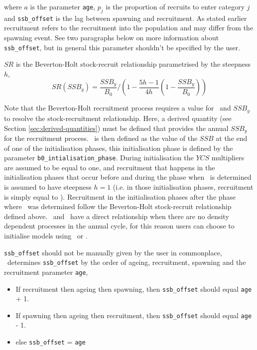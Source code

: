 where $a$ is the parameter \texttt{age}, $p_j$ is the proportion of recruits to enter category $j$ and \texttt{ssb\_offset} is the lag between spawning and recruitment. As stated earlier recruitment refers to the recruitment into the population and may differ from the spawning event. See two paragraphs below on more information about \texttt{ssb\_offset}, but in general this parameter shouldn't be specified by the user.

$SR$ is the Beverton-Holt stock-recruit relationship parametrised by the steepness $h$,
\begin{equation}\label{eq:BH_SR}
SR(SSB_y) = \frac{SSB_y}{B_0} / \left( 1-\frac{5h-1}{4h} \left( 1-\frac{SSB_y}{B_0} \right) \right)
\end{equation}

Note that the Beverton-Holt recruitment process requires a value for \Bzero\ and $SSB_y$ to resolve the stock-recruitment relationship. Here, a derived quantity (see Section \ref{sec:derived-quantities}) must be defined that provides the annual $SSB_y$ for the recruitment process. \Bzero\ is then defined as the value of the $SSB$ at the end of one of the initialisation phases, this initialisation phase is defined by the parameter \texttt{b0\_intialisation\_phase}. During initialisation the $YCS$ multipliers are assumed to be equal to one, and recruitment that happens in the initialisation phases that occur before and during the phase when \Bzero\ is determined is assumed to have steepness $h=1$ (i.e. in those initialisation phases, recruitment is simply equal to \Rzero). Recruitment in the initialisation phases after the phase where \Bzero\ was determined follow the Beverton-Holt stock-recruit relationship defined above. \Rzero\ and \Bzero\ have a direct relationship when there are no density dependent processes in the annual cycle, for this reason users can choose to initialise models using \Bzero\ or \Rzero.

\texttt{ssb\_offset} should not be manually given by the user in commonplace, \CNAME\ determines \texttt{ssb\_offset} by the order of ageing, recruitment, spawning and the recruitment parameter \texttt{age}, 
\begin{itemize}
	\item If recruitment then ageing then spawning, then \texttt{ssb\_offset} should equal \texttt{age} + 1.
	\item If spawning then ageing then recruitment, then \texttt{ssb\_offset} should equal \texttt{age} - 1.
	\item else \texttt{ssb\_offset} = \texttt{age}
\end{itemize}

